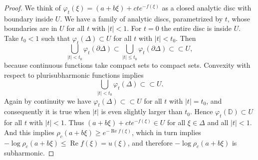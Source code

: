 \documentclass[12pt,openany]{book}
\renewcommand{\Re}{\operatorname{Re}}
\newcommand{\sabs}[1]{\lvert {#1} \rvert}
\newcommand{\D}{{\mathbb{D}}}
\theoremstyle{plain}
\theoremstyle{remark}
\theoremstyle{definition}
\theoremstyle{exercise}
\theoremstyle{example}
\begin{document}
\begin{proof}
We think of $\varphi_t(\xi) = 
(a+b\xi)+cte^{-f(\xi)}$ as a closed analytic disc with boundary inside
$U$.  We have a family of analytic discs, parametrized by $t$, whose boundaries are in
$U$ for all $t$ with $\sabs{t} < 1$.  For $t=0$ the entire disc is
inside $U$.  Take $t_0 < 1$ such that
$\varphi_t(\Delta) \subset U$ for all $t$ with $\sabs{t} < t_0$.
Then
\begin{equation*}
\bigcup_{\sabs{t} < t_0} \varphi_t(\partial \Delta)
\subset
\bigcup_{\sabs{t} \leq t_0} \varphi_t(\partial \Delta)
\subset \subset U ,
\end{equation*}
because continuous functions take compact sets to compact sets.
Convexity with respect to plurisubharmonic  functions implies 
\begin{equation*}
\bigcup_{\sabs{t} < t_0} \varphi_t(\Delta)
\subset \subset U .
\end{equation*}
Again by continuity we have $\varphi_t(\Delta) \subset \subset U$ for
all $t$ with $\sabs{t} = t_0$, and consequently it is true when $\sabs{t}$
is even slightly larger than $t_0$.
Hence $\varphi_t(\D) \subset U$
for all $t$ with $\sabs{t} < 1$.  Thus
$(a+b\xi)+cte^{-f(\xi)} \in U$ for all $\xi \in \Delta$ and all $\sabs{t} <
1$.  And this implies $\rho_c(a+b\xi) \geq e^{-\Re f(\xi)}$, which in
turn implies $-\log \rho_c(a+b\xi) \leq \Re f(\xi) = u(\xi)$, and
therefore $-\log \rho_c(a+b\xi)$ is subharmonic.
\end{proof}
\end{document}
